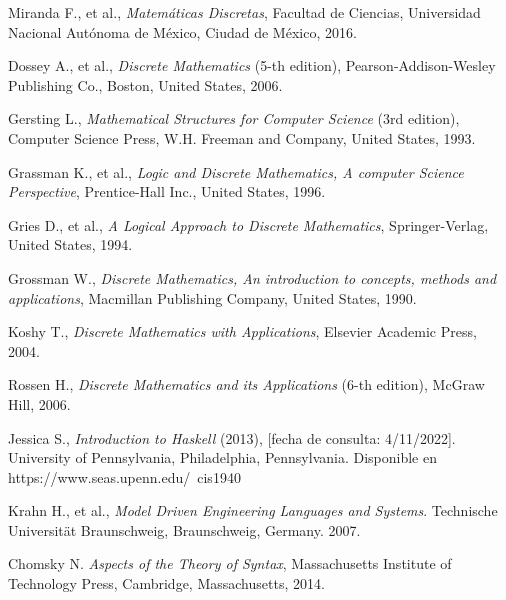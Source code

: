 \begin{thebibliography}{11}
    \bibitem{}
    \label{sec:67}
    \hypertarget{67}{}
    Miranda F., et al., \textit{Matemáticas Discretas}, Facultad de Ciencias, Universidad Nacional Autónoma de México, Ciudad de México, 2016.%

    \bibitem{}
    \label{sec:68}
    \hypertarget{68}{}
    Dossey A., et al., \textit{Discrete Mathematics} (5-th edition), Pearson-Addison-Wesley Publishing Co., Boston, United States,  2006.

    \bibitem{}
    \label{sec:69}
    \hypertarget{69}{}
    Gersting L., \textit{Mathematical Structures for Computer Science} (3rd edition), Computer Science Press, W.H. Freeman and Company, United States, 1993.

    \bibitem{}
    \label{sec:70}
    \hypertarget{70}{}
    Grassman K., et al., \textit{Logic and Discrete Mathematics, A computer Science Perspective}, Prentice-Hall Inc., United States, 1996.

    \bibitem{}
    \label{sec:71}
    \hypertarget{71}{}
    Gries D., et al., \textit{A Logical Approach to Discrete Mathematics}, Springer-Verlag, United States, 1994.

    \bibitem{}
    \label{sec:72}
    \hypertarget{72}{}
    Grossman W., \textit{Discrete Mathematics, An introduction to concepts, methods and applications}, Macmillan Publishing Company, United States, 1990.

    \bibitem{}
    \label{sec:73}
    \hypertarget{73}{}
    Koshy T., \textit{Discrete Mathematics with Applications}, Elsevier Academic Press, 2004.

    \bibitem{}
    \label{sec:74}
    \hypertarget{74}{}
    Rossen H., \textit{Discrete Mathematics and its Applications} (6-th edition), McGraw Hill, 2006.

    \bibitem{}
    \label{sec:75}
    \hypertarget{75}{}
    Jessica S., \textit{Introduction to Haskell} (2013), [fecha de consulta: 4/11/2022]. University of Pennsylvania, Philadelphia, Pennsylvania. Disponible en https://www.seas.upenn.edu/~cis1940

    \bibitem{}
    \label{sec:76}
    \hypertarget{76}{}
    Krahn H., et al., \textit{Model Driven Engineering Languages and Systems}. Technische Universität Braunschweig, Braunschweig, Germany. 2007. %

    \bibitem{}
    \label{sec:77}
    \hypertarget{77}{}
    Chomsky N. \textit{Aspects of the Theory of Syntax}, Massachusetts Institute of Technology Press, Cambridge, Massachusetts, 2014.
    

\end{thebibliography}
